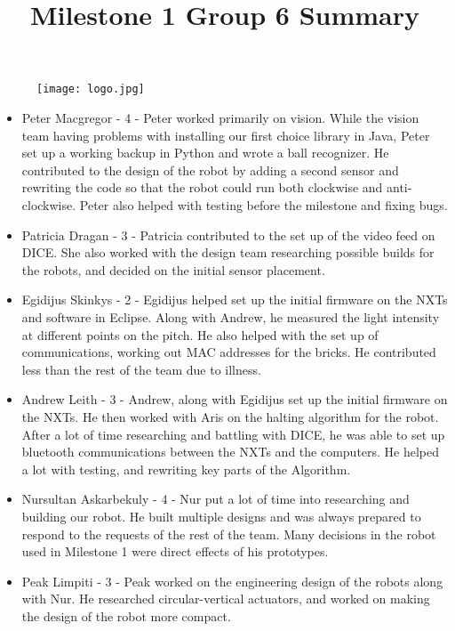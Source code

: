 \documentclass[dvips]{article}
\begin{document}
\sloppy
\begin{figure}
\centering
\texttt{[image: logo.jpg]}
\label{overflow}
\end{figure}

\title{Milestone 1 Group 6 Summary}
 
\maketitle
\begin{itemize}
\item Peter Macgregor - 4 - Peter worked primarily on vision. While the vision team having problems with installing our first choice library in Java, Peter set up a working backup in Python and wrote a ball recognizer. He contributed to the design of the robot by adding a second sensor and rewriting the code so that the robot could run both clockwise and anti-clockwise. Peter also helped with testing before the milestone and fixing bugs.
\item Patricia Dragan - 3 - Patricia contributed to the set up of the video feed on DICE. She also worked with the design team researching possible builds for the robots, and decided on the initial sensor placement. 
\item Egidijus Skinkys - 2 - Egidijus helped set up the initial firmware on the NXTs and software in Eclipse. Along with Andrew, he measured the light intensity at different points on the pitch. He also helped with the set up of communications, working out MAC addresses for the bricks. He contributed less than the rest of the team due to illness.
\item Andrew Leith - 3 - Andrew, along with Egidijus set up the initial firmware on the NXTs. He then worked with Aris on the halting algorithm for the robot. After a lot of time researching and battling with DICE, he was able to set up bluetooth communications between the NXTs and the computers. He helped a lot with testing, and rewriting key parts of the Algorithm.
\item Nursultan Askarbekuly - 4 - Nur put a lot of time into researching and building our robot. He built multiple designs and was always prepared to respond to the requests of the rest of the team. Many decisions in the robot used in Milestone 1 were direct effects of his prototypes. 
\item Peak Limpiti - 3 - Peak worked on the engineering design of the robots along with Nur. He researched circular-vertical actuators, and worked on making the design of the robot more compact. 

\end{itemize}
\end{document}
